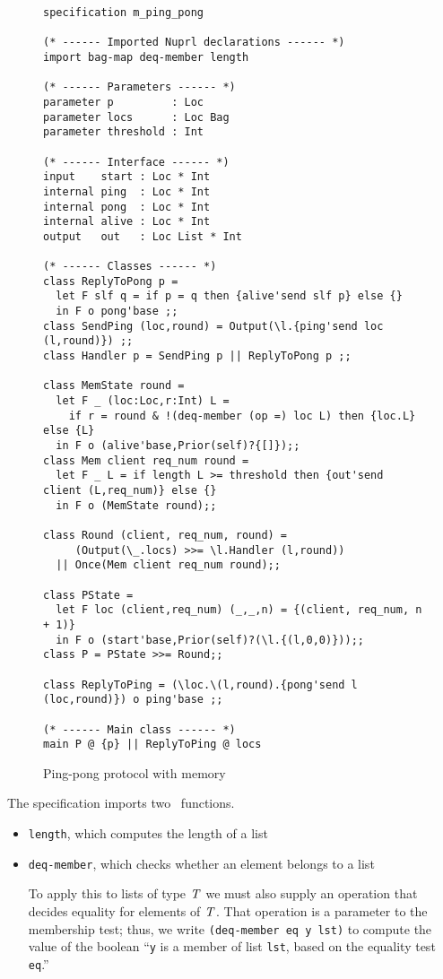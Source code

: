 \documentclass[final]{article}
\begin{document}
\begin{figure}[!t]
  \begin{lstlisting}[basicstyle=\small]
specification m_ping_pong

(* ------ Imported Nuprl declarations ------ *)
import bag-map deq-member length

(* ------ Parameters ------ *)
parameter p         : Loc
parameter locs      : Loc Bag
parameter threshold : Int

(* ------ Interface ------ *)
input    start : Loc * Int
internal ping  : Loc * Int
internal pong  : Loc * Int
internal alive : Loc * Int
output   out   : Loc List * Int

(* ------ Classes ------ *)
class ReplyToPong p =
  let F slf q = if p = q then {alive'send slf p} else {}
  in F o pong'base ;;
class SendPing (loc,round) = Output(\l.{ping'send loc (l,round)}) ;;
class Handler p = SendPing p || ReplyToPong p ;;

class MemState round =
  let F _ (loc:Loc,r:Int) L =
    if r = round & !(deq-member (op =) loc L) then {loc.L} else {L}
  in F o (alive'base,Prior(self)?{[]});;
class Mem client req_num round =
  let F _ L = if length L >= threshold then {out'send client (L,req_num)} else {}
  in F o (MemState round);;

class Round (client, req_num, round) =
     (Output(\_.locs) >>= \l.Handler (l,round))
  || Once(Mem client req_num round);;

class PState =
  let F loc (client,req_num) (_,_,n) = {(client, req_num, n + 1)}
  in F o (start'base,Prior(self)?(\l.{(l,0,0)}));;
class P = PState >>= Round;;

class ReplyToPing = (\loc.\(l,round).{pong'send l (loc,round)}) o ping'base ;;

(* ------ Main class ------ *)
main P @ {p} || ReplyToPing @ locs
  \end{lstlisting}
  \caption{Ping-pong protocol with memory}
  \label{fig:ping-pong-mem}
\end{figure}



The specification imports two \nuprl\ functions.
\begin{itemize}
\item
 \lstinline{length}, which computes the length of a list

\item\label{deq-member}
\lstinline{deq-member}, which checks whether an element belongs to a
list

To apply this to lists of type $\mathit{T}$ we must also supply an
operation that decides equality for elements of $\mathit{T}$.  That
operation is a parameter to the membership test; thus, we write
\lstinline{(deq-member eq y lst)} to compute the value of the boolean
``\lstinline{y} is a member of list \lstinline{lst}, based on the
equality test \lstinline{eq}.''
\end{itemize}
\end{document}
